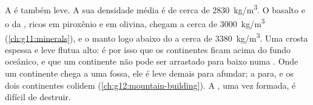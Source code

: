 A  é também leve. A sua densidade média é de cerca de
\qty{2830}{kg/m^3}. O basalto e o  da , ricos em
piroxênio e em olivina, chegam a cerca de \qty{3000}{kg/m^3}
(\cref{ch:g11:minerals}), e o manto logo abaixo do  a cerca de
\qty{3380}{kg/m^3}. Uma crosta espessa e leve flutua alto: é por isso que
os continentes ficam acima do fundo oceânico, e que um continente não pode
ser arrastado para baixo numa . Onde um continente chega a
uma fossa, ele é leve demais para afundar; a  para, e os dois
continentes colidem (\cref{ch:g12:mountain-building}). A , uma vez formada, é difícil de destruir.

